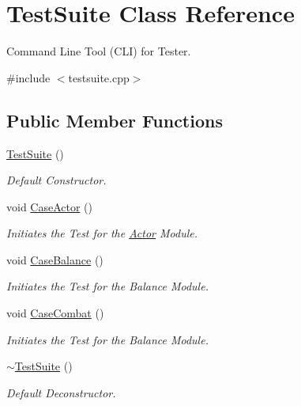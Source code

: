 \hypertarget{classTestSuite}{}\section{Test\+Suite Class Reference}
\label{classTestSuite}


Command Line Tool (C\+LI) for Tester.  




{\ttfamily \#include $<$testsuite.\+cpp$>$}

\subsection*{Public Member Functions}
\begin{DoxyCompactItemize}
\item 
\mbox{\label{classTestSuite_af7291e6d8b53443604ee0c1fcf1fadfc}} 
\mbox{\hyperlink{classTestSuite_af7291e6d8b53443604ee0c1fcf1fadfc}{Test\+Suite}} ()
\begin{DoxyCompactList}\small\item\em Default Constructor. \end{DoxyCompactList}\item 
\mbox{\label{classTestSuite_ae5810f229c2f0693fba8761103bd1089}} 
void \mbox{\hyperlink{classTestSuite_ae5810f229c2f0693fba8761103bd1089}{Case\+Actor}} ()
\begin{DoxyCompactList}\small\item\em Initiates the Test for the \mbox{\hyperlink{classActor}{Actor}} Module. \end{DoxyCompactList}\item 
\mbox{\label{classTestSuite_a7b4a22d7f98c222546dd2fc31841dbf8}} 
void \mbox{\hyperlink{classTestSuite_a7b4a22d7f98c222546dd2fc31841dbf8}{Case\+Balance}} ()
\begin{DoxyCompactList}\small\item\em Initiates the Test for the Balance Module. \end{DoxyCompactList}\item 
\mbox{\label{classTestSuite_a15f3e94cbd9ed2e2986f7f50459c52fb}} 
void \mbox{\hyperlink{classTestSuite_a15f3e94cbd9ed2e2986f7f50459c52fb}{Case\+Combat}} ()
\begin{DoxyCompactList}\small\item\em Initiates the Test for the Balance Module. \end{DoxyCompactList}\item 
\mbox{\label{classTestSuite_a1a4603e985169c62d251876dd3910b5e}} 
\mbox{\hyperlink{classTestSuite_a1a4603e985169c62d251876dd3910b5e}{$\sim$\+Test\+Suite}} ()
\begin{DoxyCompactList}\small\item\em Default Deconstructor. \end{DoxyCompactList}\end{DoxyCompactItemize}


